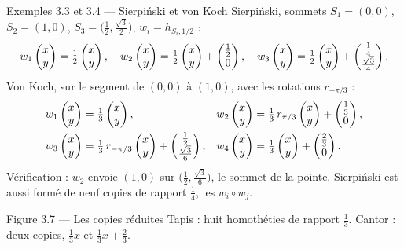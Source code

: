 \begin{frame}{Exemples 3.3 et 3.4 --- Sierpiński et von Koch}
  \small
  Sierpiński, sommets $S_1=(0,0)$, $S_2=(1,0)$,
  $S_3=\big(\tfrac12,\tfrac{\sqrt3}2\big)$, $w_i=h_{S_i,1/2}$ :
  \[
    w_1\begin{pmatrix}x\\ y\end{pmatrix} = \tfrac12\begin{pmatrix}x\\ y\end{pmatrix},\quad
    w_2\begin{pmatrix}x\\ y\end{pmatrix} = \tfrac12\begin{pmatrix}x\\ y\end{pmatrix}+\begin{pmatrix}\tfrac12\\ 0\end{pmatrix},\quad
    w_3\begin{pmatrix}x\\ y\end{pmatrix} = \tfrac12\begin{pmatrix}x\\ y\end{pmatrix}+\begin{pmatrix}\tfrac14\\ \tfrac{\sqrt3}{4}\end{pmatrix}.
  \]
  Von Koch, sur le segment de $(0,0)$ à $(1,0)$, avec les rotations
  $r_{\pm\pi/3}$ :
  \[
    \begin{aligned}
      w_1\begin{pmatrix}x\\ y\end{pmatrix} &= \tfrac13\begin{pmatrix}x\\ y\end{pmatrix}, &
      w_2\begin{pmatrix}x\\ y\end{pmatrix} &= \tfrac13\,r_{\pi/3}\begin{pmatrix}x\\ y\end{pmatrix}+\begin{pmatrix}\tfrac13\\ 0\end{pmatrix},\\
      w_3\begin{pmatrix}x\\ y\end{pmatrix} &= \tfrac13\,r_{-\pi/3}\begin{pmatrix}x\\ y\end{pmatrix}+\begin{pmatrix}\tfrac12\\ \tfrac{\sqrt3}{6}\end{pmatrix}, &
      w_4\begin{pmatrix}x\\ y\end{pmatrix} &= \tfrac13\begin{pmatrix}x\\ y\end{pmatrix}+\begin{pmatrix}\tfrac23\\ 0\end{pmatrix}.
    \end{aligned}
  \]
  Vérification : $w_2$ envoie $(1,0)$ sur
  $\big(\tfrac12,\tfrac{\sqrt3}{6}\big)$, le sommet de la pointe. Sierpiński
  est aussi formé de neuf copies de rapport $\tfrac14$, les
  $w_i\circ w_j$.
\end{frame}

\begin{frame}{Figure 3.7 --- Les copies réduites}
  \small Tapis : huit homothéties de rapport $\tfrac13$. Cantor : deux
  copies, $\tfrac13x$ et $\tfrac13x+\tfrac23$.
\end{frame}

